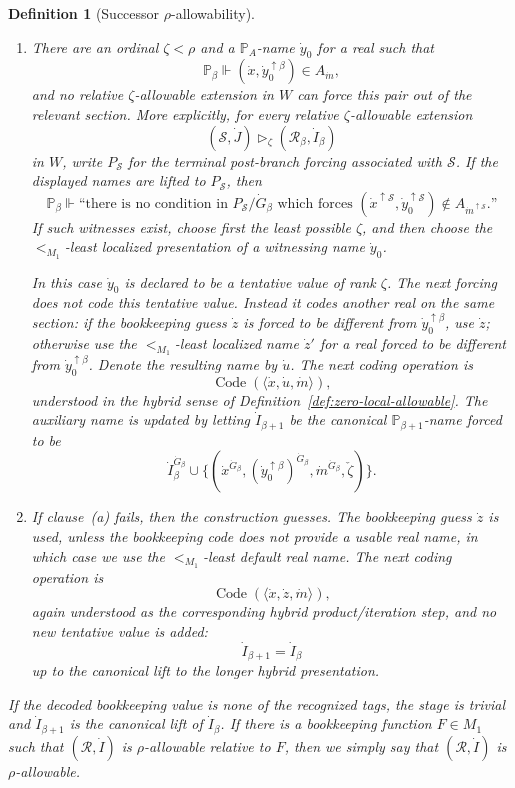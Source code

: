 \documentclass[a4paper,11pt]{article}
\newtheorem{definition}[theorem]{Definition}
\begin{document}
\begin{definition}[Successor \(\rho\)-allowability]
\begin{enumerate}
\item[(a)] There are an ordinal \(\zeta<\rho\) and a \(\mathbb P_A\)-name
\(\dot y_0\) for a real such that
\[
   \mathbb P_\beta\Vdash
   (\dot x,\dot y_0^{\uparrow\beta})\in A_{\dot m},
\]
and no relative \(\zeta\)-allowable extension in \(W\) can force this pair
out of the relevant section.  More explicitly, for every relative
\(\zeta\)-allowable extension
\[
   (\mathcal S,\dot J)\triangleright_\zeta(\mathcal R_\beta,\dot I_\beta)
\]
in \(W\), write \(P_{\mathcal S}\) for the terminal post-branch forcing
associated with \(\mathcal S\).  If the displayed names are lifted to
\(P_{\mathcal S}\), then
\[
   \mathbb P_\beta\Vdash
   \text{``there is no condition in }
   P_{\mathcal S}/\dot G_\beta
   \text{ which forces }
   (\dot x^{\uparrow\mathcal S},\dot y_0^{\uparrow\mathcal S})
      \notin A_{\dot m^{\uparrow\mathcal S}}\text{.''}
\]
If such witnesses exist, choose first the least possible \(\zeta\), and then
choose the \(<_{M_1}\)-least localized presentation of a witnessing name
\(\dot y_0\).

In this case \(\dot y_0\) is declared to be a tentative value of rank
\(\zeta\).  The next forcing does not code this tentative value.  Instead it
codes another real on the same section: if the bookkeeping guess \(\dot z\) is
forced to be different from \(\dot y_0^{\uparrow\beta}\), use \(\dot z\);
otherwise use the \(<_{M_1}\)-least localized name \(\dot z'\) for a real
forced to be different from \(\dot y_0^{\uparrow\beta}\).  Denote the resulting
name by \(\dot u\).  The next coding operation is
\[
   \operatorname{Code}(\langle\dot x,\dot u,\dot m\rangle),
\]
understood in the hybrid sense of Definition~\ref{def:zero-local-allowable}.
The auxiliary name is updated by letting \(\dot I_{\beta+1}\) be the canonical
\(\mathbb P_{\beta+1}\)-name forced to be
\[
   \dot I_\beta^{\dot G_\beta}
   \cup
   \{(\dot x^{\dot G_\beta},
       (\dot y_0^{\uparrow\beta})^{\dot G_\beta},
       \dot m^{\dot G_\beta},\check\zeta)\}.
\]

\item[(b)] If clause~(a) fails, then the construction guesses.  The bookkeeping
guess \(\dot z\) is used, unless the bookkeeping code does not provide a usable
real name, in which case we use the \(<_{M_1}\)-least default real name.  The
next coding operation is
\[
   \operatorname{Code}(\langle\dot x,\dot z,\dot m\rangle),
\]
again understood as the corresponding hybrid product/iteration step, and no
new tentative value is added:
\[
   \dot I_{\beta+1}=\dot I_\beta
\]
up to the canonical lift to the longer hybrid presentation.
\end{enumerate}

If the decoded bookkeeping value is none of the recognized tags, the stage is
trivial and \(\dot I_{\beta+1}\) is the canonical lift of \(\dot I_\beta\).  If
there is a bookkeeping function \(F\in M_1\) such that \((\mathcal R,\dot I)\) is
\(\rho\)-allowable relative to \(F\), then we simply say that
\((\mathcal R,\dot I)\) is \(\rho\)-allowable.
\end{definition}
\end{document}
